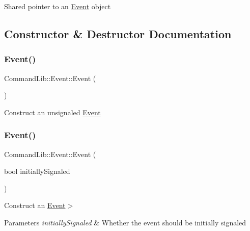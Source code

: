 Shared pointer to an \mbox{\hyperlink{class_command_lib_1_1_event}{Event}} object



\subsection{Constructor \& Destructor Documentation}
\mbox{\label{class_command_lib_1_1_event_a165569ddb4788df6b3fad0e52df5e78c}} 
\subsubsection{\texorpdfstring{Event()}{Event()}\hspace{0.1cm}{\footnotesize\ttfamily [1/2]}}
{\footnotesize\ttfamily Command\+Lib\+::\+Event\+::\+Event (\begin{DoxyParamCaption}{ }\end{DoxyParamCaption})}



Construct an unsignaled \mbox{\hyperlink{class_command_lib_1_1_event}{Event}}

\mbox{\label{class_command_lib_1_1_event_a6b00a5faf7e17ea1b5b2984e33309277}} 
\subsubsection{\texorpdfstring{Event()}{Event()}\hspace{0.1cm}{\footnotesize\ttfamily [2/2]}}
{\footnotesize\ttfamily Command\+Lib\+::\+Event\+::\+Event (\begin{DoxyParamCaption}\item[{bool}]{initially\+Signaled }\end{DoxyParamCaption})\hspace{0.3cm}{\ttfamily [explicit]}}



Construct an \mbox{\hyperlink{class_command_lib_1_1_event}{Event}}$>$


\begin{DoxyParams}{Parameters}
{\em initially\+Signaled} & Whether the event should be initially signaled\\
\hline
\end{DoxyParams}


